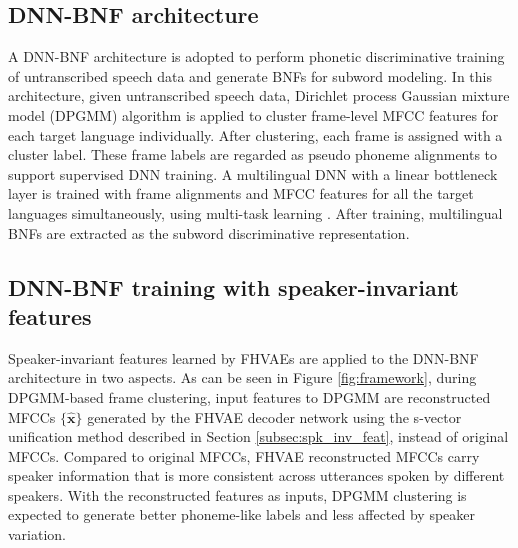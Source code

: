 \documentclass[a4paper]{article}
\begin{document}
\subsection{DNN-BNF architecture}
A DNN-BNF architecture  \cite{chen2017multilingual,Feng2018exploiting} is adopted to perform  phonetic discriminative training of untranscribed speech data and generate BNFs for subword modeling. 
In this  architecture, given untranscribed speech data,
Dirichlet process Gaussian mixture model (DPGMM) \cite{chang2013parallel} algorithm is applied to cluster frame-level MFCC features for each target language individually. 
After clustering, each frame is assigned with a cluster label. These frame labels  are regarded as pseudo phoneme alignments to support supervised DNN training. A multilingual DNN with a linear bottleneck layer is trained with frame alignments and MFCC features for all the target languages simultaneously, using multi-task learning  \cite{caruana1998multitask}. After training, multilingual BNFs are extracted as the subword discriminative  representation.

\subsection{DNN-BNF training with speaker-invariant features}
Speaker-invariant features learned by FHVAEs are applied  to the DNN-BNF architecture 
in two aspects.
As can be seen in Figure \ref{fig:framework}, during DPGMM-based frame clustering,  input features to DPGMM are reconstructed MFCCs $\{\bm{\hat{x}}\}$ generated by the FHVAE decoder network using the s-vector unification method described in Section 
\ref{subsec:spk_inv_feat}, instead of original MFCCs. Compared to original MFCCs, FHVAE reconstructed MFCCs  carry speaker information that is more consistent across utterances spoken by different speakers. With the reconstructed features as inputs, DPGMM clustering is expected to  generate better phoneme-like labels and less affected by speaker variation. 
\end{document}

